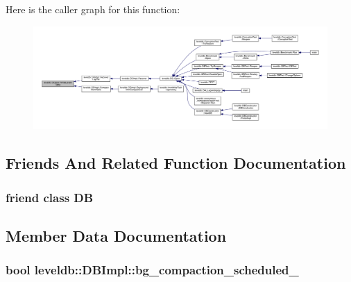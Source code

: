 Here is the caller graph for this function\+:
\nopagebreak
\begin{figure}[H]
\begin{center}
\leavevmode
\includegraphics[width=350pt]{classleveldb_1_1_d_b_impl_ae491d85586e72c5cd624ee5a8ee3e852_icgraph}
\end{center}
\end{figure}




\subsection{Friends And Related Function Documentation}
\hypertarget{classleveldb_1_1_d_b_impl_ad22eb7a23cbf34de526efa966c578d4a}{}
\subsubsection[{D\+B}]{\setlength{\rightskip}{0pt plus 5cm}friend class {\bf D\+B}\hspace{0.3cm}{\ttfamily [friend]}}\label{classleveldb_1_1_d_b_impl_ad22eb7a23cbf34de526efa966c578d4a}


\subsection{Member Data Documentation}
\hypertarget{classleveldb_1_1_d_b_impl_a0f9a6ce141d1aace77fc15538b0d7f63}{}
\subsubsection[{bg\+\_\+compaction\+\_\+scheduled\+\_\+}]{\setlength{\rightskip}{0pt plus 5cm}bool leveldb\+::\+D\+B\+Impl\+::bg\+\_\+compaction\+\_\+scheduled\+\_\+\hspace{0.3cm}{\ttfamily [private]}}\label{classleveldb_1_1_d_b_impl_a0f9a6ce141d1aace77fc15538b0d7f63}
\hypertarget{classleveldb_1_1_d_b_impl_a44a499ab00f5139ffbca3a57707bd2d2}{}
